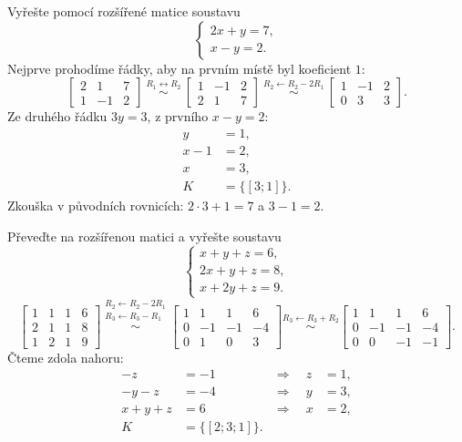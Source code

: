 \documentclass[11pt,a4paper]{article}
\begin{document}
\begin{prikladReseniBox}[title={Příklad 1}]
Vyřešte pomocí rozšířené matice soustavu
\[
\begin{cases}2x+y=7,\\x-y=2.\end{cases}
\]
\tcblower
Nejprve prohodíme řádky, aby na prvním místě byl koeficient $1$:
\[
\left[\begin{array}{cc|c}2&1&7\\1&-1&2\end{array}\right]
\ \overset{R_1\leftrightarrow R_2}{\sim}\
\left[\begin{array}{cc|c}1&-1&2\\2&1&7\end{array}\right]
\ \overset{R_2\leftarrow R_2-2R_1}{\sim}\
\left[\begin{array}{cc|c}1&-1&2\\0&3&3\end{array}\right].
\]
Ze druhého řádku $3y=3$, z prvního $x-y=2$:
\[\begin{aligned}
y&=1,\\x-1&=2,\\x&=3,\\K&=\{[3;1]\}.
\end{aligned}\]
Zkouška v původních rovnicích: $2\cdot3+1=7$ a $3-1=2$.
\end{prikladReseniBox}

\begin{prikladReseniBox}[title={Příklad 2}]
Převeďte na rozšířenou matici a vyřešte soustavu
\[
\begin{cases}x+y+z=6,\\2x+y+z=8,\\x+2y+z=9.\end{cases}
\]
\tcblower
\[
\left[\begin{array}{ccc|c}1&1&1&6\\2&1&1&8\\1&2&1&9\end{array}\right]
\overset{\substack{R_2\leftarrow R_2-2R_1\\R_3\leftarrow R_3-R_1}}{\sim}
\left[\begin{array}{ccc|c}1&1&1&6\\0&-1&-1&-4\\0&1&0&3\end{array}\right]
\overset{R_3\leftarrow R_3+R_2}{\sim}
\left[\begin{array}{ccc|c}1&1&1&6\\0&-1&-1&-4\\0&0&-1&-1\end{array}\right].
\]
Čteme zdola nahoru:
\[\begin{aligned}
-z&=-1&\Rightarrow\quad z&=1,\\
-y-z&=-4&\Rightarrow\quad y&=3,\\
x+y+z&=6&\Rightarrow\quad x&=2,\\
K&=\{[2;3;1]\}.
\end{aligned}\]
\end{prikladReseniBox}
\end{document}
